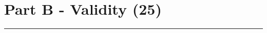 \section*{Part B - Validity (25)}

\noindent \begin{center}
\rule[0.5ex]{1\linewidth}{1pt}
\par\end{center}

\begin{comment}
The digital forensics landscape is dominated by various software vendors who
provide digital forensics software tools. Many have significant sales teams which
have pushed the narrative in the marketplace that their tools have been court
validated, and as such their tools should be trusted and used. This has created
a situation where much of digital forensics practice globally revolves around
the use of these tools, and that certification in the use of these tools has been
the standard approach to conducting digital forensics. Draft an academic essay
addressing the following:
     Whether, considering acceptable forensic science practice applied to the
    field of digital forensics, the claims by vendors of court validation" satisfy
    the scientific requirement of tool validity. Motivate your arguments.
     Does the domination of the digital forensics field by commercial digital
    forensic software hinder or benefit (or both) the practice of digital foren-
    sics?
Your report should be 8-10 pages long.

NOTE: While references are likely to be sparse in this document, the 
assessment will focus on the strength of argumentation and justification of your
decision making process.
\end{comment}